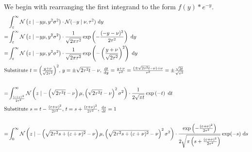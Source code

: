 \documentclass[11pt,a4paper]{book}
\begin{document}
We begin with rearranging the first integrand to the form $f(y) * e^{-y}$.
\begin{align*}
  & \int_{\varepsilon}^{\infty} \mathcal{N}\left( z \mid -y\mu, y^{2}\sigma^{2} \right) \cdot \mathcal{N}(-y \mid \nu, \tau^{2})~\mathrm{d}y \\
  =& \int_{\varepsilon}^{\infty} \mathcal{N}\left( z \mid -y\mu, y^{2}\sigma^{2} \right) \cdot \frac{1}{\sqrt{2 \pi \tau^{2}}} \exp\left( -\frac{(-y - \nu)^{2}}{2\tau^{2}} \right)~\mathrm{d}y\\
  =& \int_{\varepsilon}^{\infty} \mathcal{N}\left( z \mid -y\mu, y^{2}\sigma^{2} \right) \cdot \frac{1}{\sqrt{2 \pi \tau^{2}}} \exp\left( -\left( \frac{y + \nu}{\sqrt{2\tau^{2}}} \right)^{2} \right)~\mathrm{d}y\\
  \intertext{Substitute $t = \left( \frac{y + \nu}{\sqrt{2\tau^{2}}} \right)^{2}$, $y = \pm \sqrt{2\tau^{2} t} - \nu$, $\frac{\mathrm{d}t}{\mathrm{d}y} = \frac{y + \nu}{\tau^{2}} = \frac{(\pm \sqrt{2\tau^{2} t} - \nu) + \nu}{\tau^{2}} = \pm \frac{\sqrt{2t}}{\sqrt{\tau^{2}}}$}\\
  =& \int_{\frac{(\varepsilon + \nu)^{2}}{2\tau^{2}}}^{\infty} \mathcal{N}\left( z \mid -\left( \sqrt{2\tau^{2} t} - \nu \right)\mu, \left( \sqrt{2\tau^{2} t} - \nu \right)^{2}\sigma^{2} \right) \cdot \frac{1}{2 \sqrt{\pi t}} \exp\left( -t \right)~\mathrm{d}t\\
  \intertext{Substitute $s = t - \frac{(\varepsilon + \nu)^{2}}{2\tau^{2}}$, $t = s + \frac{(\varepsilon + \nu)^{2}}{2\tau^{2}}$, $\frac{\mathrm{d}s}{\mathrm{d}t} = 1$}\\
  =& \int_{0}^{\infty} \mathcal{N}\left( z \mid -\left( \sqrt{2\tau^{2}s + (\varepsilon + \nu)^{2}} - \nu \right)\mu, \left( \sqrt{2\tau^{2}s + (\varepsilon + \nu)^{2}} - \nu \right)^{2}\sigma^{2} \right) \cdot \frac{\exp\left( -\frac{(\varepsilon + \nu)^{2}}{2\tau^{2}} \right)}{2 \sqrt{\pi \left( s + \frac{(\varepsilon + \nu)^{2}}{2\tau^{2}} \right)}} \exp(-s)~\mathrm{d}s
\end{align*}
\end{document}
